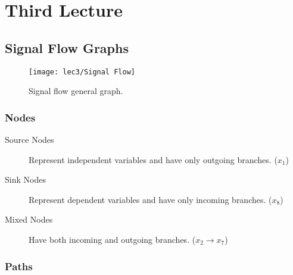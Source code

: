 \setchapterpreamble[u]{\margintoc}
\chapter{Third Lecture}


\section{Signal Flow Graphs}

\begin{figure}[h]
	\texttt{[image: lec3/Signal Flow]}
	\caption{Signal flow general graph.}
\end{figure}

\vspace{-1.25mm}
\subsection[Nodes]{Nodes}

\begin{description}
	\item[Source Nodes]  Represent independent variables and have only outgoing branches. ($x_1$)
	\item[Sink Nodes]  Represent dependent variables and have only incoming branches. ($x_8$)
	\item[Mixed Nodes]  Have both incoming and outgoing branches. ($x_2 \to x_7$)
\end{description}

\vspace{-1.25mm}
\subsection[Paths]{Paths}



